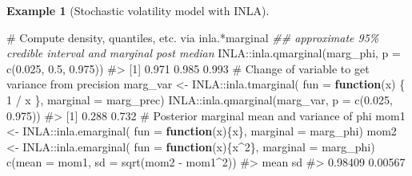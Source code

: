 \documentclass[
  11pt,
  letterpaper,
]{scrbook}
\newenvironment{Shaded}{\begin{snugshade}}{\end{snugshade}}
\newcommand{\AttributeTok}[1]{\textcolor[rgb]{0.40,0.45,0.13}{#1}}
\newcommand{\CommentTok}[1]{\textcolor[rgb]{0.37,0.37,0.37}{#1}}
\newcommand{\ControlFlowTok}[1]{\textcolor[rgb]{0.00,0.23,0.31}{\textbf{#1}}}
\newcommand{\DecValTok}[1]{\textcolor[rgb]{0.68,0.00,0.00}{#1}}
\newcommand{\DocumentationTok}[1]{\textcolor[rgb]{0.37,0.37,0.37}{\textit{#1}}}
\newcommand{\FloatTok}[1]{\textcolor[rgb]{0.68,0.00,0.00}{#1}}
\newcommand{\FunctionTok}[1]{\textcolor[rgb]{0.28,0.35,0.67}{#1}}
\newcommand{\NormalTok}[1]{\textcolor[rgb]{0.00,0.23,0.31}{#1}}
\newcommand{\OtherTok}[1]{\textcolor[rgb]{0.00,0.23,0.31}{#1}}
\newcommand{\SpecialCharTok}[1]{\textcolor[rgb]{0.37,0.37,0.37}{#1}}
\theoremstyle{definition}
\newtheorem{example}{Example}[chapter]
\theoremstyle{plain}
\theoremstyle{plain}
\theoremstyle{plain}
\theoremstyle{definition}
\theoremstyle{definition}
\theoremstyle{plain}
\theoremstyle{plain}
\theoremstyle{remark}
\begin{document}
\begin{example}[Stochastic volatility model with
INLA]
\begin{Shaded}
\begin{Highlighting}[]
\CommentTok{\# Compute density, quantiles, etc. via inla.*marginal}
\DocumentationTok{\#\# approximate 95\% credible interval and marginal post median}
\NormalTok{INLA}\SpecialCharTok{::}\FunctionTok{inla.qmarginal}\NormalTok{(marg\_phi, }\AttributeTok{p =} \FunctionTok{c}\NormalTok{(}\FloatTok{0.025}\NormalTok{, }\FloatTok{0.5}\NormalTok{, }\FloatTok{0.975}\NormalTok{))}
\CommentTok{\#\textgreater{} [1] 0.971 0.985 0.993}
\CommentTok{\# Change of variable to get variance from precision}
\NormalTok{marg\_var }\OtherTok{\textless{}{-}}\NormalTok{ INLA}\SpecialCharTok{::}\FunctionTok{inla.tmarginal}\NormalTok{(}
  \AttributeTok{fun =} \ControlFlowTok{function}\NormalTok{(x) \{ }\DecValTok{1} \SpecialCharTok{/}\NormalTok{ x \}, }
  \AttributeTok{marginal =}\NormalTok{ marg\_prec)}
\NormalTok{INLA}\SpecialCharTok{::}\FunctionTok{inla.qmarginal}\NormalTok{(marg\_var, }\AttributeTok{p =} \FunctionTok{c}\NormalTok{(}\FloatTok{0.025}\NormalTok{, }\FloatTok{0.975}\NormalTok{))}
\CommentTok{\#\textgreater{} [1] 0.288 0.732}
\CommentTok{\# Posterior marginal mean and variance of phi}
\NormalTok{mom1 }\OtherTok{\textless{}{-}}\NormalTok{ INLA}\SpecialCharTok{::}\FunctionTok{inla.emarginal}\NormalTok{(}
    \AttributeTok{fun =} \ControlFlowTok{function}\NormalTok{(x)\{x\}, }
    \AttributeTok{marginal =}\NormalTok{ marg\_phi)}
\NormalTok{mom2 }\OtherTok{\textless{}{-}}\NormalTok{ INLA}\SpecialCharTok{::}\FunctionTok{inla.emarginal}\NormalTok{(}
    \AttributeTok{fun =} \ControlFlowTok{function}\NormalTok{(x)\{x}\SpecialCharTok{\^{}}\DecValTok{2}\NormalTok{\}, }
    \AttributeTok{marginal =}\NormalTok{ marg\_phi)}
\FunctionTok{c}\NormalTok{(}\AttributeTok{mean =}\NormalTok{ mom1, }\AttributeTok{sd =} \FunctionTok{sqrt}\NormalTok{(mom2 }\SpecialCharTok{{-}}\NormalTok{ mom1}\SpecialCharTok{\^{}}\DecValTok{2}\NormalTok{))}
\CommentTok{\#\textgreater{}    mean      sd }
\CommentTok{\#\textgreater{} 0.98409 0.00567}
\end{Highlighting}
\end{Shaded}

\end{example}
\end{document}
